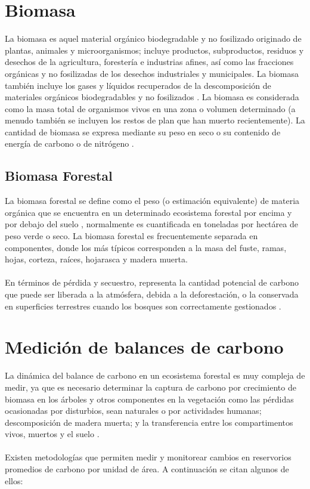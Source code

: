\section{Biomasa}
La biomasa es aquel material org\'anico biodegradable y no fosilizado originado de plantas, animales y microorganismos; incluye productos, subproductos, residuos y desechos de la agricultura, forester\'ia e industrias afines, as\'i como las fracciones org\'anicas y no fosilizadas de los desechos industriales y municipales. La biomasa tambi\'en incluye los gases y l\'iquidos recuperados de la descomposici\'on de materiales org\'anicos biodegradables y no fosilizados \cite{salinas2008guia}.
La biomasa es considerada como la masa total de organismos vivos en una zona o volumen determinado (a menudo también se incluyen los restos de plan que han muerto recientemente). La cantidad de biomasa se expresa mediante su peso en seco o su contenido de energ\'ia de carbono o de nitr\'ogeno \cite{garciduenas1987produccion}.
\subsection{Biomasa Forestal}
La biomasa forestal se define como el peso (o estimaci\'on equivalente) de materia org\'anica que
se encuentra en un determinado ecosistema forestal por encima y por debajo del suelo \cite{schlegel2000manual}, normalmente es
cuantificada en toneladas por hect\'area de peso verde o seco. La biomasa forestal es frecuentemente separada en
componentes, donde los m\'as t\'ipicos corresponden a la masa del fuste, ramas, hojas, corteza,
ra\'ices, hojarasca y madera muerta. \\~\\
En t\'erminos de p\'erdida y secuestro, representa la cantidad potencial de carbono que puede ser liberada a la atm\'osfera, debida a la deforestaci\'on, o la conservada en superficies terrestres cuando los bosques son correctamente gestionados \cite{lu2005exploring}.

\section{Medici\'on de balances de carbono}
La din\'amica del balance de carbono en un ecosistema forestal es muy compleja de medir, ya que es necesario determinar la captura de carbono por crecimiento de biomasa en los \'arboles y otros componentes en la vegetaci\'on como las p\'erdidas ocasionadas por disturbios, sean naturales o por actividades humanas; descomposici\'on de madera muerta; y la transferencia entre los compartimentos vivos, muertos y el suelo \cite{angelsen2008moving}.\\~\\
Existen metodolog\'ias que permiten medir y monitorear cambios en reservorios promedios de carbono por unidad de \'area. A continuaci\'on se citan algunos de ellos:

